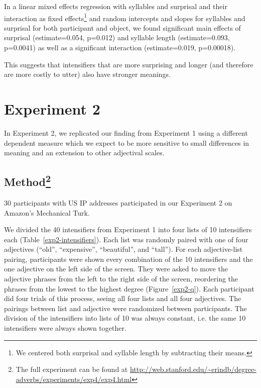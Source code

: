 \documentclass[10pt,letterpaper]{article}
\begin{document}
In a linear mixed effects regression with syllables and surprisal and their interaction as fixed effects\footnote{We centered both surprisal and syllable length by subtracting their means.} and random intercepts and slopes for syllables and surprisal for both participant and object, we found significant main effects of surprisal (estimate=0.054, p=0.012) and syllable length  (estimate=0.093, p=0.0041) as well as a significant interaction (estimate=0.019, p=0.00018).

This suggests that intensifiers that are more surprising and longer (and therefore are more costly to utter) also have stronger meanings.



\section{Experiment 2}

In Experiment 2, we replicated our finding from Experiment 1 using a different dependent measure which we expect to be more sensitive to small differences in meaning and an extension to other adjectival scales.

\subsection{Method\footnote{The full experiment can be found at \url{http://web.stanford.edu/~erindb/degree-adverbs/experiments/exp4/exp4.html}}}

30 participants with US IP addresses participated in our Experiment 2 on Amazon's Mechanical Turk.

We divided the 40 intensifiers from Experiment 1 into four lists of 10 intensifiers each (Table~\ref{exp2-intensifiers}). Each list was randomly paired with one of four adjectives (``old'', ``expensive'', ``beautiful'', and ``tall''). For each adjective-list pairing, participants were shown every combination of the 10 intensifiers and the one adjective on the left side of the screen. They were asked to move the adjective phrases from the left to the right side of the screen, reordering the phrases from the lowest to the highest degree (Figure~\ref{exp2-q}). Each participant did four trials of this process, seeing all four lists and all four adjectives. The pairings between list and adjective were randomized between participants. The division of the intensifiers into lists of 10 was always constant, i.e. the same 10 intensifiers were always shown together.
\end{document}
